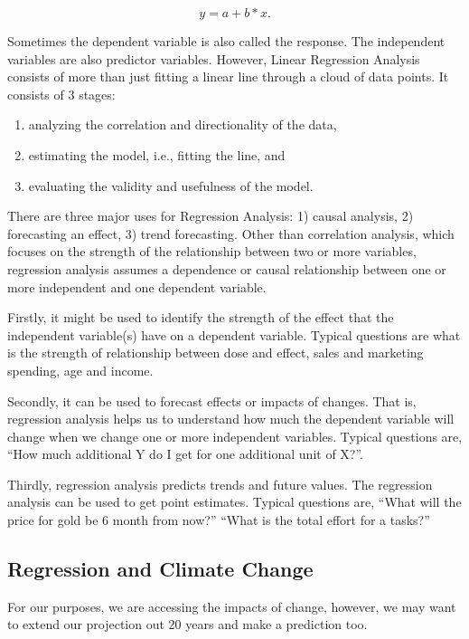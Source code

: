 \documentclass{article}\usepackage[]{graphicx}\usepackage[]{color}
\begin{document}
\begin{equation}
y = a + b*x.
\end{equation}

Sometimes the dependent variable is also called the response.  The independent variables are also predictor variables.  However, Linear Regression Analysis consists of more than just fitting a linear line through a cloud of data points.  It consists of 3 stages:

\begin{enumerate}
  \item analyzing the correlation and directionality of the data, 
  \item estimating the model, i.e., fitting the line, and 
  \item evaluating the validity and usefulness of the model.
\end{enumerate}

There are three major uses for Regression Analysis: 1) causal analysis, 2) forecasting an effect, 3) trend forecasting.  Other than correlation analysis, which focuses on the strength of the relationship between two or more variables, regression analysis assumes a dependence or causal relationship between one or more independent and one dependent variable.

Firstly, it might be used to identify the strength of the effect that the independent variable(s) have on a dependent variable.  Typical questions are what is the strength of relationship between dose and effect, sales and marketing spending, age and income.

Secondly, it can be used to forecast effects or impacts of changes.  That is, regression analysis helps us to understand how much the dependent variable will change when we change one or more independent variables.  Typical questions are, “How much additional Y do I get for one additional unit of X?”.

Thirdly, regression analysis predicts trends and future values.  The regression analysis can be used to get point estimates.  Typical questions are, ``What will the price for gold be 6 month from now?'' ``What is the total effort for a tasks?''

\subsection{Regression and Climate Change}
For our purposes, we are accessing the impacts of change, however, we may want to extend our projection out 20 years and make a prediction too. 
\end{document}
